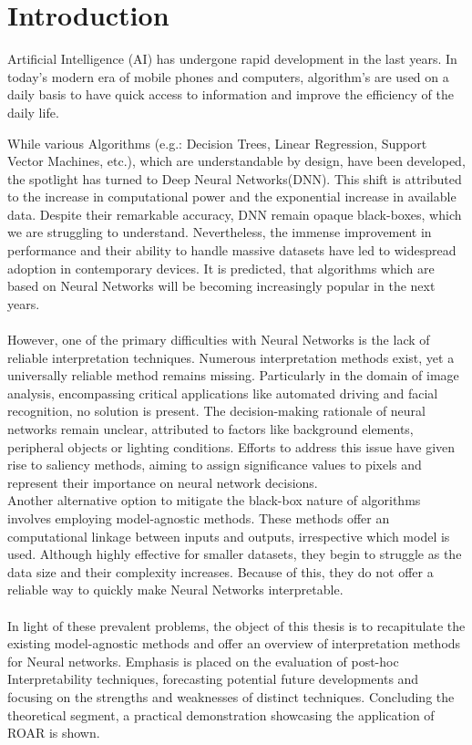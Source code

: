 
\chapter{Introduction}

Artificial Intelligence (AI) has undergone rapid development in the last years. In today's modern era of mobile phones and computers, algorithm's are used on a daily basis to have quick access to information and improve the efficiency of the daily life.

While various Algorithms (e.g.: Decision Trees, Linear Regression, Support Vector Machines, etc.), which are understandable by design, have been developed, the spotlight has turned to Deep Neural Networks(DNN). This shift is attributed to the increase in computational power and the exponential increase in available data. Despite their remarkable accuracy, DNN remain opaque black-boxes, which we are struggling to understand. Nevertheless, the immense improvement in performance and their ability to handle massive datasets have led to widespread adoption in contemporary devices. It is predicted, that algorithms which are based on Neural Networks will be becoming increasingly popular in the next years.
\\\\
However, one of the primary difficulties with Neural Networks is the lack of reliable interpretation techniques. Numerous interpretation methods exist, yet a universally reliable method remains missing. Particularly in the domain of image analysis, encompassing critical applications like automated driving and facial recognition, no solution is present. The decision-making rationale of neural networks remain unclear, attributed to factors like background elements, peripheral objects or lighting conditions.
Efforts to address this issue have given rise to saliency methods, aiming to assign significance values to pixels and represent their importance on neural network decisions.
\\
Another alternative option to mitigate the black-box nature of  algorithms involves employing model-agnostic methods. These methods offer an computational linkage between inputs and outputs, irrespective which model is used. Although highly effective for smaller datasets, they begin to struggle as the data size and their complexity increases. Because of this, they do not offer a reliable way to quickly make Neural Networks interpretable.
\\\\
In light of these prevalent problems, the object of this thesis is to recapitulate the existing model-agnostic methods and offer an overview of interpretation methods for Neural networks. Emphasis is placed on the evaluation of post-hoc Interpretability techniques, forecasting potential future developments and focusing on the strengths and weaknesses of distinct  techniques. Concluding the theoretical segment, a practical demonstration showcasing the application of ROAR is shown. 






